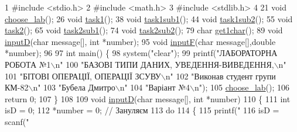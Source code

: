 \begin{DoxyCodeInclude}
1 \textcolor{preprocessor}{#include <stdio.h>}
2 \textcolor{preprocessor}{#include <math.h>}
3 \textcolor{preprocessor}{#include <stdlib.h>}
4 
21 \textcolor{keywordtype}{void} \hyperlink{main_8c_a967daaa1c8b4c7d21c4ccf7a81fbe67d}{choose\_lab}();
26 \textcolor{keywordtype}{void} \hyperlink{main_8c_afde07648040c326129670547738a0c86}{task1}();
38 \textcolor{keywordtype}{void} \hyperlink{main_8c_ad0ae7d23ef39095cda907019fd94ed96}{task1sub1}();
44 \textcolor{keywordtype}{void} \hyperlink{main_8c_ab6b6fe73040966990d9129dbf55cb110}{task1sub2}();
55 \textcolor{keywordtype}{void} \hyperlink{main_8c_afb35a54f26606b4808ac0a8d9ad55433}{task2}();
65 \textcolor{keywordtype}{void} \hyperlink{main_8c_a49562a6161d394ce5f96b6731e07e440}{task2sub1}();
74 \textcolor{keywordtype}{void} \hyperlink{main_8c_a08a44a4f43367b221db5d4e7b2657623}{task2sub2}();
79 \textcolor{keywordtype}{char} \hyperlink{main_8c_a20531ce01d5668d3c0eafb037eb3c514}{get1char}();
89 \textcolor{keywordtype}{void} \hyperlink{main_8c_aa9f623385e5c1c8ac44a985d44cf3c5a}{inputD}(\textcolor{keywordtype}{char} message[], \textcolor{keywordtype}{int} *number);
95 \textcolor{keywordtype}{void} \hyperlink{main_8c_a67a83febb2bdcd536c9edefe419afb2e}{inputF}(\textcolor{keywordtype}{char} message[],\textcolor{keywordtype}{double} *number);
96 
97 \textcolor{keywordtype}{int} main() \{
98     system(\textcolor{stringliteral}{"clear"});
99     printf(\textcolor{stringliteral}{"ЛАБОРАТОРНА РОБОТА №1\(\backslash\)n"}
100            \textcolor{stringliteral}{"БАЗОВІ ТИПИ ДАНИХ, УВЕДЕННЯ-ВИВЕДЕННЯ,\(\backslash\)n"}
101            \textcolor{stringliteral}{"БІТОВІ ОПЕРАЦІЇ, ОПЕРАЦІЇ ЗСУВУ\(\backslash\)n"}
102            \textcolor{stringliteral}{"Виконав студент групи КМ-82\(\backslash\)n"}
103            \textcolor{stringliteral}{"Бубела Дмитро\(\backslash\)n"}
104            \textcolor{stringliteral}{"Варіант №4\(\backslash\)n"});
105     \hyperlink{main_8c_a967daaa1c8b4c7d21c4ccf7a81fbe67d}{choose\_lab}();
106     \textcolor{keywordflow}{return} 0;
107 \}
108 
109 \textcolor{keywordtype}{void} \hyperlink{main_8c_aa9f623385e5c1c8ac44a985d44cf3c5a}{inputD}(\textcolor{keywordtype}{char} message[], \textcolor{keywordtype}{int} *number)
110 \{
111     \textcolor{keywordtype}{int} isD = 0;
112     *number = 0; \textcolor{comment}{// Зануляєм}
113     \textcolor{keywordflow}{do}
114     \{
115         printf(\textcolor{stringliteral}{"%
116         isD = scanf(\textcolor{stringliteral}{"%
}}
\end{DoxyCodeInclude}
